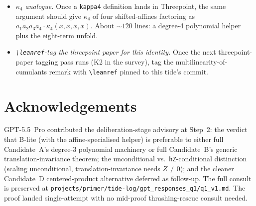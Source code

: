 \documentclass[11pt]{article}
\begin{document}
\begin{itemize}[leftmargin=1em,itemsep=0.2em]
\item \emph{$\kappa_4$ analogue.} Once a \texttt{kappa4} definition
  lands in Threepoint, the same argument should give $\kappa_4$ of
  four shifted-affines factoring as
  $a_1 a_2 a_3 a_4 \cdot \kappa_4(x,x,x,x)$. About ${\sim}120$
  lines: a degree-4 polynomial helper plus the eight-term unfold.

\item \emph{\texttt{\textbackslash leanref}-tag the threepoint paper
  for this identity.} Once the next threepoint-paper tagging pass
  runs (K2 in the survey), tag the multilinearity-of-cumulants
  remark with \texttt{\textbackslash leanref} pinned to this tide's
  commit.
\end{itemize}

\section*{Acknowledgements}

GPT-5.5~Pro contributed the deliberation-stage advisory at Step~2:
the verdict that B-lite (with the affine-specialised helper) is
preferable to either full Candidate~A's degree-3 polynomial machinery
or full Candidate~B's generic translation-invariance theorem; the
unconditional vs.\ \texttt{hZ}-conditional distinction (scaling
unconditional, translation-invariance needs $Z \neq 0$); and the
cleaner Candidate~D centered-product alternative deferred as
follow-up. The full consult is preserved at
\texttt{projects/primer/tide-log/gpt\_responses\_q1/q1\_v1.md}. The
proof landed single-attempt with no mid-proof thrashing-rescue
consult needed.
\end{document}
